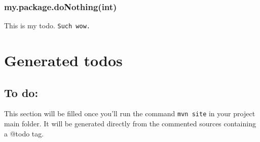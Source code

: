\documentclass[10pt,onecolumn]{report}
\begin{document}
\subsection*{my.package.doNothing(int)}

 This is my todo. \texttt{Such wow.}





\appendix
\chapter{Generated todos}

{
  
}{
  \section{To do:}
  This section will be filled once you'll run the command \texttt{mvn site} in
  your project main folder. It will be generated directly from the commented
  sources containing a @todo tag.
}

\end{document}

